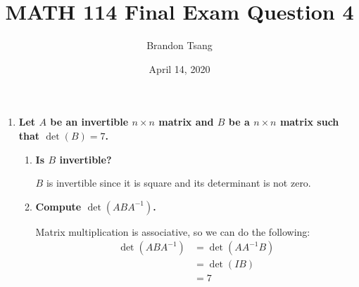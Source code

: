 \documentclass[11pt]{article}
\title{MATH 114 Final Exam Question 4}
\author{Brandon Tsang}
\date{April 14, 2020}
\begin{document}
    \maketitle
    \begin{enumerate}[label=\textbf{\arabic*.}, start=4]
        \item{
            \textbf{\boldmath Let \(A\) be an invertible \(n\times n\) matrix and \(B\) be a \(n\times n\) matrix such that \(\det(B)=7\).}
            \begin{enumerate}[label=\textbf{(\alph*)}]
                \item{
                    \textbf{\boldmath Is \(B\) invertible?}
                    \par
                    \(B\) is invertible since it is square and its determinant is not zero.
                }
                \item{
                    \textbf{\boldmath Compute \(\det(ABA^{-1})\).}
                    \par
                    Matrix multiplication is associative, so we can do the following:
                    \begin{align*}
                        \det(ABA^{-1})&=\det(AA^{-1}B) \\
                        &=\det(IB) \\
                        &=7
                    \end{align*}
                }
            \end{enumerate}
        }
    \end{enumerate}
\end{document}
